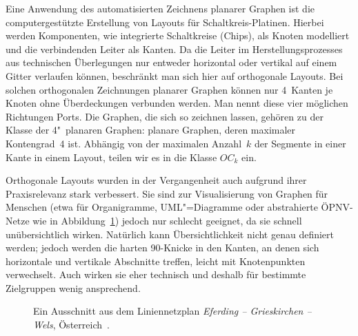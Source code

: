 \documentclass[a4paper]{scrreprt}
\theoremstyle{definition}
\begin{document}
Eine Anwendung des automatisierten Zeichnens planarer Graphen ist die computergestützte Erstellung von Layouts für Schaltkreis-Platinen. Hierbei werden Komponenten, wie integrierte Schaltkreise (Chips), als Knoten modelliert und die verbindenden Leiter als Kanten. Da die Leiter im Herstellungsprozesses  aus technischen Überlegungen nur entweder horizontal oder vertikal auf einem Gitter verlaufen können, beschränkt man sich hier auf orthogonale Layouts. Bei solchen orthogonalen Zeichnungen planarer Graphen können nur 4~Kanten je Knoten ohne Überdeckungen verbunden werden. Man nennt diese vier möglichen Richtungen Ports. Die Graphen, die sich so zeichnen lassen, gehören zu der Klasse der 4"~planaren Graphen: planare Graphen, deren maximaler Kontengrad~4 ist. Abhängig von der maximalen Anzahl~$k$ der Segmente in einer Kante in einem Layout, teilen wir es in die Klasse $OC_k$ ein.

Orthogonale Layouts wurden in der Vergangenheit auch aufgrund ihrer Praxisrelevanz stark verbessert. Sie sind zur Visualisierung von Graphen für Menschen (etwa für Organigramme, UML"=Diagramme oder abstrahierte ÖPNV-Netze wie in Abbildung~\ref{fig:liniennetzplan}) jedoch nur schlecht geeignet, da sie schnell unübersichtlich wirken. %
Natürlich kann Übersichtlichkeit nicht genau definiert werden; jedoch werden die harten 90\textdegree-Knicke in den Kanten, an denen sich horizontale und vertikale Abschnitte treffen, leicht mit Knotenpunkten verwechselt. Auch wirken sie eher technisch und deshalb für bestimmte Zielgruppen wenig ansprechend.

\begin{figure}[h]
  \centering
  \caption{Ein Ausschnitt aus dem Liniennetzplan \emph{Eferding -- Grieskirchen -- Wels}, Österreich~\cite{waldherr-14}.}
  \label{fig:liniennetzplan}
\end{figure}
\end{document}
